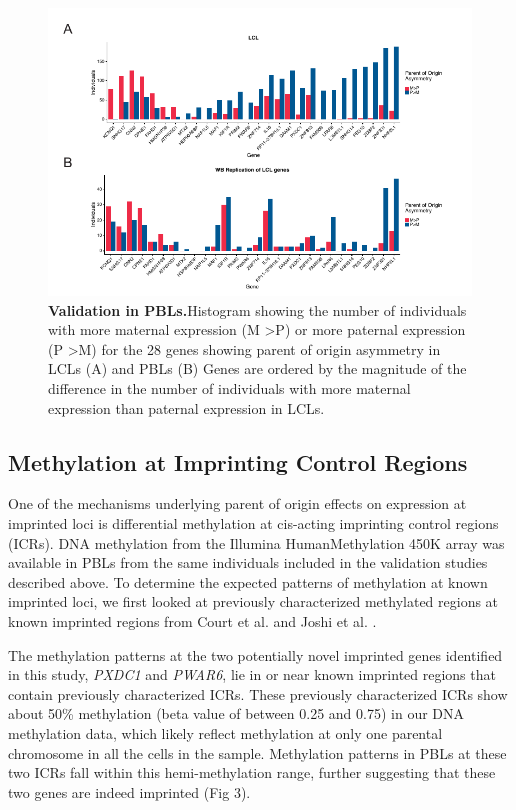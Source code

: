 \begin{figure}[!htb]
\centering \includegraphics[width=6in]{img/ch03/fig-02.pdf}
\caption[Validation in PBLs.]{\textbf{Validation in PBLs.}Histogram showing the number of individuals with more maternal expression (M \textgreater P) or more paternal expression (P \textgreater M) for the 28 genes showing parent of origin asymmetry in LCLs (A) and PBLs (B) Genes are ordered by the magnitude of the difference in the number of individuals with more maternal expression than paternal expression in LCLs. }
\label{fig:matpatPBLs}
\end{figure}


\subsection{Methylation at Imprinting Control Regions}\label{Methylation at Imprinting Control Regions}
One of the mechanisms underlying parent of origin effects on expression at imprinted loci is differential methylation at cis-acting imprinting control regions (ICRs). DNA methylation from the Illumina HumanMethylation 450K array was available in PBLs from the same individuals included in the validation studies described above. To determine the expected patterns of methylation at known imprinted loci, we first looked at previously characterized methylated regions at known imprinted regions from Court et al. and Joshi et al. \cite{Court:2014kc,Joshi:2016bb}.

The methylation patterns at the two potentially novel imprinted genes identified in this study, \emph{PXDC1} and \emph{PWAR6}, lie in or near known imprinted regions that contain previously characterized ICRs. These previously characterized ICRs show about 50\% methylation (beta value of between 0.25 and 0.75) in our DNA methylation data, which likely reflect methylation at only one parental chromosome in all the cells in the sample. Methylation patterns in PBLs at these two ICRs fall within this hemi-methylation range, further suggesting that these two genes are indeed imprinted (Fig 3).


